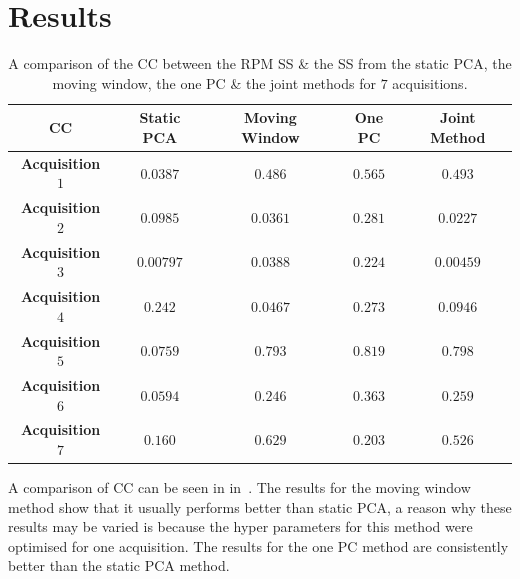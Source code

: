 \section{Results} \label{sec:results}
    \begin{table}
        \centering
        \captionsetup{singlelinecheck=false, justification=centering}
        \caption{A comparison of the \gls{CC} between the \gls{RPM} \gls{SS} \& the \gls{SS} from the static \gls{PCA}, the moving window, the one \gls{PC} \& the joint methods for $7$ acquisitions.}
        
        \resizebox*{0.75\linewidth}{!}
        {
            \begin{tabular}{||c|cccc||}
                \hline
                \textbf{\gls{CC}} & \textbf{Static \gls{PCA}} & \textbf{Moving Window} & \textbf{One \gls{PC}} & \textbf{Joint Method} \\
                \hline
                \textbf{Acquisition $1$}   & $0.0387$  & $0.486$  & $0.565$  & $0.493$   \\
                \textbf{Acquisition $2$}   & $0.0985$  & $0.0361$ & $0.281$  & $0.0227$  \\
                \textbf{Acquisition $3$}   & $0.00797$ & $0.0388$ & $0.224$  & $0.00459$ \\
                \textbf{Acquisition $4$}   & $0.242$   & $0.0467$ & $0.273$  & $0.0946$  \\
                \textbf{Acquisition $5$}   & $0.0759$  & $0.793$  & $0.819$  & $0.798$   \\
                \textbf{Acquisition $6$}   & $0.0594$  & $0.246$  & $0.363$  & $0.259$   \\
                \textbf{Acquisition $7$}   & $0.160$   & $0.629$  & $0.203$  & $0.526$   \\
                \hline
            \end{tabular}
        }
        \label{tab:cross_correlation}
    \end{table}
    
    A comparison of \gls{CC} can be seen in in~. The results for the moving window method show that it usually performs better than static \gls{PCA}, a reason why these results may be varied is because the hyper parameters for this method were optimised for one acquisition. The results for the one \gls{PC} method are consistently better than the static \gls{PCA} method.
    
